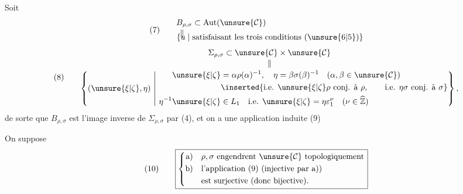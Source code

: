 Soit 
\[
(7)\qquad
\begin{aligned}
B_{\rho,\sigma}&\subset\mathrm{Aut}(\unsure{\mathcal{C}})\\[-2pt]
\Vert\quad&\\[-10pt]
\{u\mid{}&\text{satisfaisant les trois conditions }(\unsure{6|5})\}
\end{aligned}
\]
\[
(8)\qquad
\begin{gathered}
\Sigma_{\rho,\sigma}\subset\unsure{\mathcal{C}}\times\unsure{\mathcal{C}}\\[-2pt]
\Vert\\[-2pt]
\left\{(\unsure{\xi|\zeta},\eta)\ \middle|\ 
\begin{aligned}
\unsure{\xi|\zeta}&=\alpha\rho(\alpha)^{-1},\quad
\eta=\beta\sigma(\beta)^{-1}\quad(\alpha,\beta\in\unsure{\mathcal{C}})\\
&\inserted{\text{i.e. }\unsure{\xi|\zeta}\rho\text{ conj. à }\rho,\qquad\text{i.e. }\eta\sigma\text{ conj. à }\sigma}\\
\eta^{-1}\unsure{\xi|\zeta}&\in L_1\quad\text{i.e. }\unsure{\xi|\zeta}=\eta\varepsilon_1^\nu\quad(\nu\in\widehat{\mathbb Z})
\end{aligned}\right\},
\end{gathered}
\]
de sorte que $B_{\rho,\sigma}$ est l'image inverse de $\Sigma_{\rho,\sigma}$ par (4), et on a une application induite
\diagram{\begin{tikzcd}
B_{\rho,\sigma}\arrow[r,"\varphi=\varphi_{\rho,\sigma}"]&\Sigma_{\rho,\sigma}.
\end{tikzcd}}\hfill(9)

On suppose
\[
(10)\qquad\boxed{\left\{\begin{aligned}
\text{a)}\quad&\rho,\sigma\text{ engendrent }\unsure{\mathcal{C}}\text{ topologiquement}\\
\text{b)}\quad&\text{l'application (9) (injective par a))}\\
&\text{est surjective (donc bijective).}
\end{aligned}\right.}
\]

